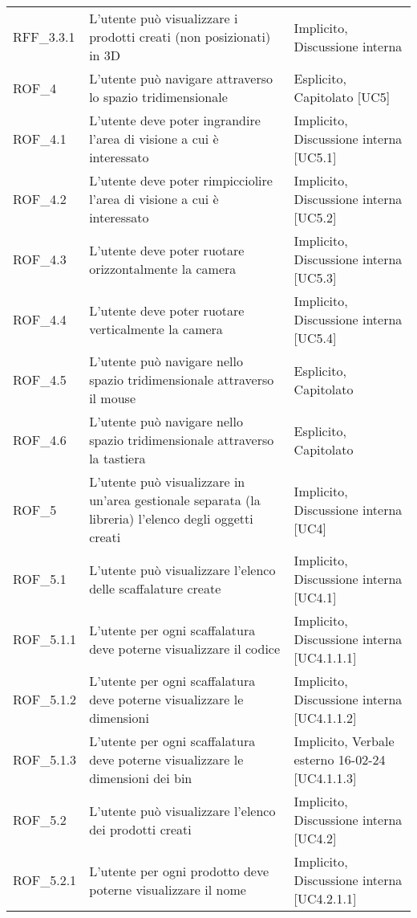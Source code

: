 \begin{xltabular}{\textwidth}{ p{0.1\textwidth} | X | p{0.3\textwidth} }
    RFF\_3.3.1 & L'utente può visualizzare i prodotti creati (non posizionati) in 3D & Implicito, Discussione interna \\      
    ROF\_4 & L'utente può navigare attraverso lo spazio tridimensionale & Esplicito, Capitolato [UC5]\\
    ROF\_4.1 & L'utente deve poter ingrandire l'area di visione a cui è interessato & Implicito, Discussione interna [UC5.1] \\
    ROF\_4.2 & L'utente deve poter rimpicciolire l'area di visione a cui è interessato & Implicito, Discussione interna [UC5.2] \\
    ROF\_4.3 & L'utente deve poter ruotare orizzontalmente la camera & Implicito, Discussione interna [UC5.3] \\
    ROF\_4.4 & L'utente deve poter ruotare verticalmente la camera & Implicito, Discussione interna [UC5.4] \\
    ROF\_4.5 & L'utente può navigare nello spazio tridimensionale attraverso il mouse& Esplicito, Capitolato\\
    ROF\_4.6 & L'utente può navigare nello spazio tridimensionale attraverso la tastiera& Esplicito, Capitolato\\
    ROF\_5 & L'utente può visualizzare in un'area gestionale separata (la libreria) l'elenco degli oggetti creati & Implicito, Discussione interna [UC4] \\
    ROF\_5.1 & L'utente può visualizzare l'elenco delle scaffalature create & Implicito, Discussione interna [UC4.1] \\
    ROF\_5.1.1 & L'utente per ogni scaffalatura deve poterne visualizzare il codice & Implicito, Discussione interna [UC4.1.1.1]\\
    ROF\_5.1.2 & L'utente per ogni scaffalatura deve poterne visualizzare le dimensioni & Implicito, Discussione interna [UC4.1.1.2]\\
    ROF\_5.1.3 & L'utente per ogni scaffalatura deve poterne visualizzare le dimensioni dei bin & Implicito, Verbale esterno 16-02-24 [UC4.1.1.3]\\
    ROF\_5.2 & L'utente può visualizzare l'elenco dei prodotti creati & Implicito, Discussione interna [UC4.2] \\
    ROF\_5.2.1 & L'utente per ogni prodotto deve poterne visualizzare il nome & Implicito, Discussione interna [UC4.2.1.1]\\

\end{xltabular}
